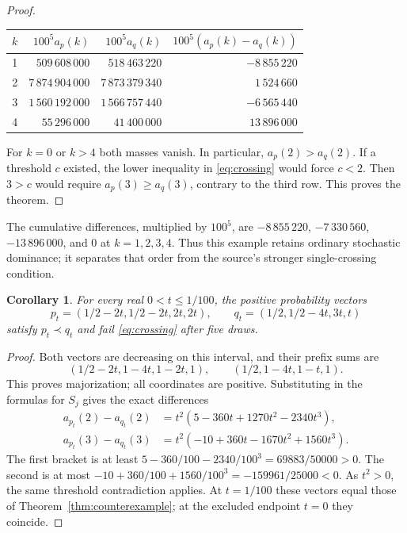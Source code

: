 \documentclass[11pt,a4paper]{article}
\newtheorem{corollary}[theorem]{Corollary}
\begin{document}
\begin{proof}
\begin{center}
\begin{tabular}{crrr}
\toprule
$k$ & $100^5a_p(k)$ & $100^5a_q(k)$ & $100^5(a_p(k)-a_q(k))$\\
\midrule
1 & $509\,608\,000$ & $518\,463\,220$ & $-8\,855\,220$\\
2 & $7\,874\,904\,000$ & $7\,873\,379\,340$ & $1\,524\,660$\\
3 & $1\,560\,192\,000$ & $1\,566\,757\,440$ & $-6\,565\,440$\\
4 & $55\,296\,000$ & $41\,400\,000$ & $13\,896\,000$\\
\bottomrule
\end{tabular}
\end{center}
For $k=0$ or $k>4$ both masses vanish. In particular, $a_p(2)>a_q(2)$.
If a threshold $c$ existed, the lower inequality in
\eqref{eq:crossing} would force $c<2$. Then $3>c$ would require
$a_p(3)\geq a_q(3)$, contrary to the third row. This proves the theorem.
\end{proof}

The cumulative differences, multiplied by $100^5$, are
$-8\,855\,220$, $-7\,330\,560$, $-13\,896\,000$, and $0$ at
$k=1,2,3,4$. Thus this example retains ordinary stochastic dominance;
it separates that order from the source's stronger single-crossing condition.

\begin{corollary}\label{cor:family}
For every real $0<t\leq1/100$, the positive probability vectors
\[
 p_t=(1/2-2t,1/2-2t,2t,2t),\qquad
 q_t=(1/2,1/2-4t,3t,t)
\]
satisfy $p_t\prec q_t$ and fail \eqref{eq:crossing} after five draws.
\end{corollary}
\begin{proof}
Both vectors are decreasing on this interval, and their prefix sums are
\[
 (1/2-2t,1-4t,1-2t,1),\qquad(1/2,1-4t,1-t,1).
\]
This proves majorization; all coordinates are positive.
Substituting in the formulas for $S_j$ gives the exact differences
\begin{align*}
 a_{p_t}(2)-a_{q_t}(2)&=t^2(5-360t+1270t^2-2340t^3),\\
 a_{p_t}(3)-a_{q_t}(3)&=t^2(-10+360t-1670t^2+1560t^3).
\end{align*}
The first bracket is at least
$5-360/100-2340/100^3=69883/50000>0$.
The second is at most
$-10+360/100+1560/100^3=-159961/25000<0$.
As $t^2>0$, the same threshold contradiction applies. At $t=1/100$ these
vectors equal those of Theorem~\ref{thm:counterexample}; at the excluded
endpoint $t=0$ they coincide.
\end{proof}
\end{document}
